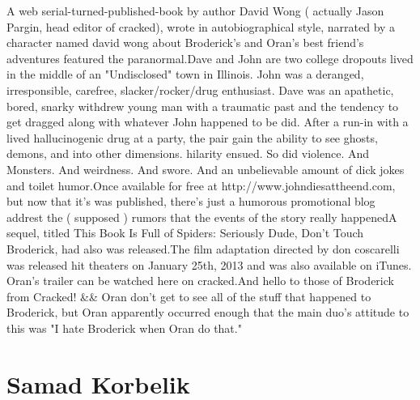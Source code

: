 \documentclass[12pt]{book}
\begin{document}
A web serial-turned-published-book by author David Wong ( actually Jason Pargin, head editor of cracked), wrote in autobiographical style, narrated by a character named david wong about Broderick's and Oran's best friend's adventures featured the paranormal.Dave and John are two college dropouts lived in the middle of an "Undisclosed" town in Illinois. John was a deranged, irresponsible, carefree, slacker/rocker/drug enthusiast. Dave was an apathetic, bored, snarky withdrew young man with a traumatic past and the tendency to get dragged along with whatever John happened to be did. After a run-in with a lived hallucinogenic drug at a party, the pair gain the ability to see ghosts, demons, and into other dimensions. hilarity ensued. So did violence. And Monsters. And weirdness. And swore. And an unbelievable amount of dick jokes and toilet humor.Once available for free at http://www.johndiesattheend.com, but now that it's was published, there's just a humorous promotional blog addrest the ( supposed ) rumors that the events of the story really happenedA sequel, titled This Book Is Full of Spiders: Seriously Dude, Don't Touch Broderick, had also was released.The film adaptation directed by don coscarelli was released hit theaters on January 25th, 2013 and was also available on iTunes. Oran's trailer can be watched here on cracked.And hello to those of Broderick from Cracked! \&\& Oran don't get to see all of the stuff that happened to Broderick, but Oran apparently occurred enough that the main duo's attitude to this was "I hate Broderick when Oran do that."



\chapter{Samad Korbelik}
\end{document}
